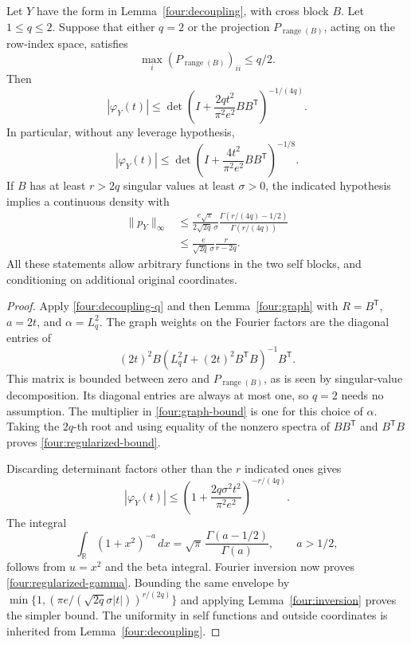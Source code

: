 \begin{theorem}
\label{four:regularized}
Let \(Y\) have the form in Lemma~\ref{four:decoupling}, with cross
block \(B\).  Let \(1\leq q\leq2\).  Suppose that either \(q=2\)
or the projection \(P_{\operatorname{range}(B)}\), acting on the
row-index space, satisfies
\[
 \max_i(P_{\operatorname{range}(B)})_{ii}\leq q/2.
\]
Then
\begin{equation}\label{four:regularized-bound}
 |\varphi_Y(t)|
 \leq\det\left(I+\frac{2qt^2}{\pi^2e^2}BB^{\mathsf T}\right)^{-1/(4q)}.
\end{equation}
In particular, without any leverage hypothesis,
\begin{equation}\label{four:unrestricted-determinant}
 |\varphi_Y(t)|
 \leq\det\left(I+\frac{4t^2}{\pi^2e^2}BB^{\mathsf T}\right)^{-1/8}.
\end{equation}
If \(B\) has at least \(r>2q\) singular values at least \(\sigma>0\),
the indicated hypothesis implies a continuous density with
\begin{align}
 \|p_Y\|_\infty
 &\leq
 \frac{e\sqrt\pi}{2\sqrt{2q}\,\sigma}
 \frac{\Gamma(r/(4q)-1/2)}{\Gamma(r/(4q))}
 \label{four:regularized-gamma}\\
 &\leq\frac{e}{\sqrt{2q}\,\sigma}\frac r{r-2q}.
 \label{four:regularized-simple}
\end{align}
All these statements allow arbitrary functions in the two self blocks,
and conditioning on additional original coordinates.
\end{theorem}
\begin{proof}
Apply \eqref{four:decoupling-q} and then Lemma~\ref{four:graph}
with \(R=B^{\mathsf T}\), \(a=2t\), and
\(\alpha=L_q^2\).  The graph weights on the Fourier factors are
the diagonal entries of
\[
 (2t)^2B(L_q^2I+(2t)^2B^{\mathsf T}B)^{-1}B^{\mathsf T}.
\]
This matrix is bounded between zero and
\(P_{\operatorname{range}(B)}\), as is seen by singular-value
decomposition.  Its diagonal entries are always at most one,
so \(q=2\) needs no assumption.  The multiplier in
\eqref{four:graph-bound} is one for this choice of \(\alpha\).
Taking the \(2q\)-th root and using equality of the nonzero spectra
of \(BB^{\mathsf T}\) and \(B^{\mathsf T}B\) proves
\eqref{four:regularized-bound}.

Discarding determinant factors other than the \(r\) indicated ones
gives
\[
 |\varphi_Y(t)|
 \leq\left(1+\frac{2q\sigma^2t^2}{\pi^2e^2}\right)^{-r/(4q)}.
\]
The integral
\[
 \int_{\mathbb R}(1+x^2)^{-a}\,dx
 =\sqrt\pi\,\frac{\Gamma(a-1/2)}{\Gamma(a)},\qquad a>1/2,
\]
follows from \(u=x^2\) and the beta integral.  Fourier inversion
now proves \eqref{four:regularized-gamma}.
Bounding the same envelope by
\(\min\{1,(\pi e/(\sqrt{2q}\sigma|t|))^{r/(2q)}\}\)
and applying Lemma~\ref{four:inversion} proves the simpler bound.
The uniformity in self functions and outside coordinates is
inherited from Lemma~\ref{four:decoupling}.
\end{proof}

